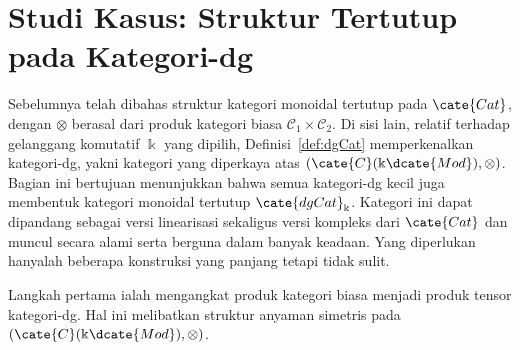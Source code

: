 
\section{Studi Kasus: Struktur Tertutup pada Kategori-dg}\label{sec:dg-closed}
\hypertarget{o014.aljabr2.chapter7.closed-structure-dgcat}{ }
Sebelumnya telah dibahas struktur kategori monoidal tertutup pada
$\cate{Cat}$, dengan $\otimes$ berasal dari produk kategori biasa
$\mathcal{C}_1\times\mathcal{C}_2$. Di sisi lain, relatif terhadap gelanggang
komutatif $\Bbbk$ yang dipilih, Definisi~\ref{def:dgCat} memperkenalkan
kategori-dg, yakni kategori yang diperkaya atas
$(\cate{C}(\Bbbk\dcate{Mod}),\otimes)$. Bagian ini bertujuan menunjukkan bahwa
semua kategori-dg kecil juga membentuk kategori monoidal tertutup
$\cate{dgCat}_{\Bbbk}$. Kategori ini dapat dipandang sebagai versi
linearisasi sekaligus versi kompleks dari $\cate{Cat}$ dan muncul secara
alami serta berguna dalam banyak keadaan. Yang diperlukan hanyalah beberapa
konstruksi yang panjang tetapi tidak sulit.

Langkah pertama ialah mengangkat produk kategori biasa menjadi produk
tensor kategori-dg. Hal ini melibatkan struktur anyaman simetris pada
$(\cate{C}(\Bbbk\dcate{Mod}),\otimes)$.

